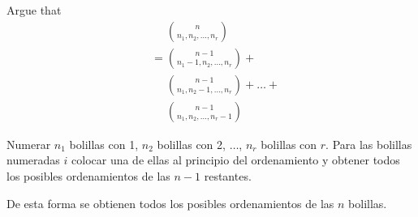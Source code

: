 \item Argue that
\begin{align*}
    &\phantom{{}={}} \binom{n}{n_1, n_2, \dots, n_r}\\
    &= \binom{n-1}{n_1 - 1, n_2, \dots, n_r} + {}\\
    &\phantom{{}={}} \binom{n-1}{n_1, n_2 - 1, \dots, n_r} + \dots + {}\\
    &\phantom{{}={}} \binom{n-1}{n_1, n_2, \dots, n_r-1}
\end{align*}

Numerar $n_1$ bolillas con 1, $n_2$ bolillas con 2, $\dots$, $n_r$ bolillas con $r$. Para las bolillas numeradas $i$ colocar una de ellas al principio del ordenamiento y obtener todos los posibles ordenamientos de las $n-1$ restantes.

De esta forma se obtienen todos los posibles ordenamientos de las $n$ bolillas.